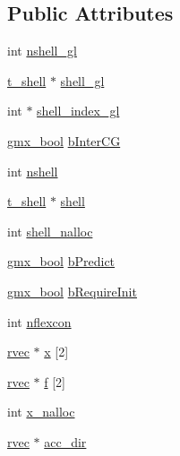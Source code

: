 \subsection*{\-Public \-Attributes}
\begin{DoxyCompactItemize}
\item 
int \hyperlink{structgmx__shellfc_a1da7c84ed586b4ea57f80bc91f23f26c}{nshell\-\_\-gl}
\item 
\hyperlink{structt__shell}{t\-\_\-shell} $\ast$ \hyperlink{structgmx__shellfc_af2f76bdbe90d77615d077ad403f73d43}{shell\-\_\-gl}
\item 
int $\ast$ \hyperlink{structgmx__shellfc_a89bc377b25116373f1ce0334cef10c93}{shell\-\_\-index\-\_\-gl}
\item 
\hyperlink{include_2types_2simple_8h_a8fddad319f226e856400d190198d5151}{gmx\-\_\-bool} \hyperlink{structgmx__shellfc_a9e1f632b569a5110de3ddd4af8802c1b}{b\-Inter\-C\-G}
\item 
int \hyperlink{structgmx__shellfc_af71cec14de672f7e8f399ec84249472a}{nshell}
\item 
\hyperlink{structt__shell}{t\-\_\-shell} $\ast$ \hyperlink{structgmx__shellfc_a6ff70ce6532ac36625c842e25a241daa}{shell}
\item 
int \hyperlink{structgmx__shellfc_ac3c11731d8096158b22d2330e2453c38}{shell\-\_\-nalloc}
\item 
\hyperlink{include_2types_2simple_8h_a8fddad319f226e856400d190198d5151}{gmx\-\_\-bool} \hyperlink{structgmx__shellfc_a8fcc99e4d203a519fc7e3856e545a2b2}{b\-Predict}
\item 
\hyperlink{include_2types_2simple_8h_a8fddad319f226e856400d190198d5151}{gmx\-\_\-bool} \hyperlink{structgmx__shellfc_a7cd82435ca7584598eddfce43690834c}{b\-Require\-Init}
\item 
int \hyperlink{structgmx__shellfc_acf9ebf7421b48c5b5966c4dfd8329c9b}{nflexcon}
\item 
\hyperlink{share_2template_2gromacs_2types_2simple_8h_aa02a552a4abd2f180c282a083dc3a999}{rvec} $\ast$ \hyperlink{structgmx__shellfc_ab09555249187ef47ffb3db5deec2e37e}{x} \mbox{[}2\mbox{]}
\item 
\hyperlink{share_2template_2gromacs_2types_2simple_8h_aa02a552a4abd2f180c282a083dc3a999}{rvec} $\ast$ \hyperlink{structgmx__shellfc_abb6cc2a0d3a1d0003345a7361ecd6714}{f} \mbox{[}2\mbox{]}
\item 
int \hyperlink{structgmx__shellfc_a86f551afa12c97e0690735150abd1e7e}{x\-\_\-nalloc}
\item 
\hyperlink{share_2template_2gromacs_2types_2simple_8h_aa02a552a4abd2f180c282a083dc3a999}{rvec} $\ast$ \hyperlink{structgmx__shellfc_ab42a7060e32fa3c3c778c62529287db5}{acc\-\_\-dir}

\end{DoxyCompactItemize}

